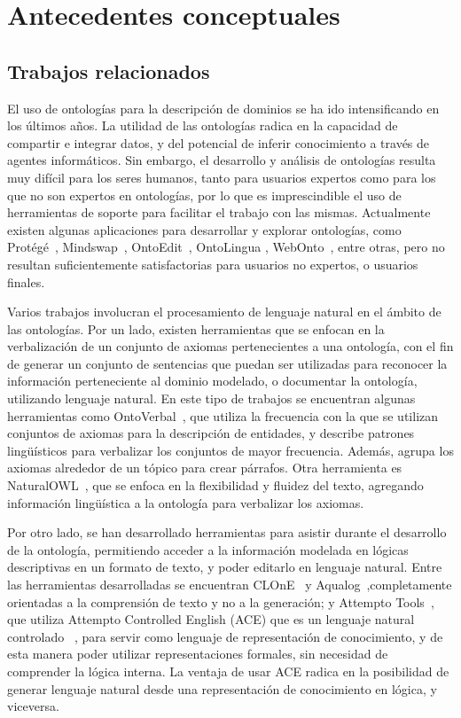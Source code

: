 \chapter{Antecedentes conceptuales}

\section{Trabajos relacionados}

El uso de ontologías para la descripción de dominios se ha ido intensificando en los últimos años. La utilidad de las ontologías radica en la capacidad de compartir e integrar datos, y del potencial de inferir conocimiento a través de agentes informáticos. Sin embargo, el desarrollo y análisis de ontologías resulta muy difícil para los seres humanos, tanto para usuarios expertos como para los que no son expertos en ontologías, por lo que es imprescindible el uso de herramientas de soporte para facilitar el trabajo con las mismas. Actualmente existen algunas aplicaciones para desarrollar y explorar ontologías, como Protégé~\cite{protege}, Mindswap~\cite{golbeck2002new}, OntoEdit~\cite{sure2002ontoedit}, OntoLingua \cite{farquhar1997ontolingua}, WebOnto~\cite{domingue1998tadzebao}, entre otras, pero no resultan suficientemente satisfactorias para usuarios no expertos, o usuarios finales. 

Varios trabajos involucran el procesamiento de lenguaje natural en el ámbito de las ontologías. Por un lado, existen herramientas que se enfocan en la verbalización de un conjunto de axiomas pertenecientes a una ontología, con el fin de generar un conjunto de sentencias que puedan ser utilizadas para reconocer la información perteneciente al dominio modelado, o documentar la ontología, utilizando lenguaje natural. En este tipo de trabajos se encuentran algunas herramientas como OntoVerbal~\cite{liang2013ontoverbal}, que utiliza la frecuencia con la que se utilizan conjuntos de axiomas para la descripción de entidades, y describe patrones lingüísticos para verbalizar los conjuntos de mayor frecuencia. Además, agrupa los axiomas alrededor de un tópico para crear párrafos. Otra herramienta es NaturalOWL~\cite{galanis2007generating}, que se enfoca en la flexibilidad y fluidez del texto, agregando información lingüística a la ontología para verbalizar los axiomas.

Por otro lado, se han desarrollado herramientas para asistir durante el desarrollo de la ontología, permitiendo acceder a la información modelada en lógicas descriptivas en un formato de texto, y poder editarlo en lenguaje natural. Entre las herramientas desarrolladas se encuentran CLOnE~\cite{power2010complexity} y Aqualog~\cite{lopez2005aqualog},completamente orientadas a la comprensión de texto y no a la generación; y Attempto Tools~\cite{attempto}, que utiliza Attempto Controlled English  (ACE) que es un lenguaje natural controlado ~\cite{CNL}, para servir como lenguaje de representación de conocimiento, y de esta manera poder utilizar representaciones formales, sin necesidad de comprender la lógica interna. La ventaja de usar ACE radica en la posibilidad de generar lenguaje natural desde una representación de conocimiento en lógica, y viceversa.

